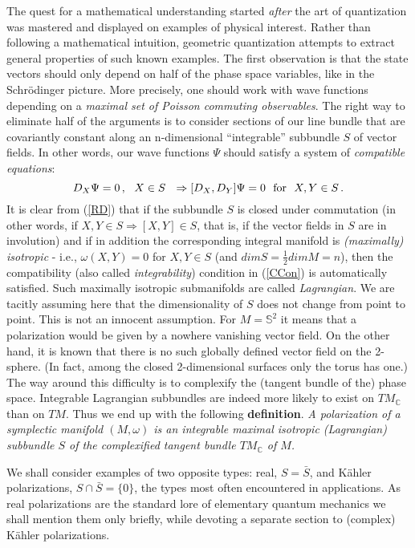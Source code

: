 \documentclass[12pt]{article}
\begin{document}
The quest for a mathematical understanding started {\it after} the art of quantization was mastered and
displayed on examples of physical interest. Rather than following a mathematical intuition, geometric quantization
attempts to extract general properties of such known examples. The first observation is that the state vectors
should only depend on half of the phase space variables, like in the Schr\"odinger picture. More precisely, one
should work with wave functions depending on a {\it maximal set of Poisson commuting observables}.  The right
way to eliminate half of the arguments is to consider sections of our line bundle that are covariantly constant
along an n-dimensional ``integrable'' subbundle $S$ of vector fields. In other words, our wave functions $\Psi$
should satisfy a system of {\it compatible equations}:
\begin{equation}
\label{CCon}
D_X\Psi = 0\,, \ \ X\in S \ \ \Rightarrow [D_X, D_Y]\Psi = 0 \ \ {\rm for} \ \ X, Y \in S\,.
\end{equation}
It is clear from (\ref{RD}) that if the subbundle $S$ is closed under commutation (in other words, if
$X, Y \in S \Rightarrow [X, Y] \in S$, that is, if the vector fields in $S$ are in involution) and if in
addition the corresponding integral manifold is {\it (maximally) isotropic} - i.e., $\omega(X, Y) = 0$ for $X, Y \in S$
(and $dim S = \frac{1}{2} dim M = n$), then the compatibility (also called {\it integrability}) condition in (\ref{CCon}) 
is automatically satisfied.  Such maximally isotropic submanifolds are called {\it Lagrangian}. We are tacitly
assuming here that the dimensionality of $S$ does not change from point to point. This is not an innocent assumption.
For $M = {\mathbb S}^2$ it means that a polarization would be given by a nowhere vanishing vector field. On the other
hand, it is known that there is no such globally defined vector field on the 2-sphere. (In fact, among the closed
2-dimensional surfaces only the torus has one.) The way around this difficulty is to complexify the (tangent bundle of
the) phase space. Integrable Lagrangian subbundles are indeed more likely to exist on $TM_{\mathbb{C}}$ than on $TM$.
Thus we end up with the following {\bf definition}. {\it A polarization of a symplectic manifold $(M, \omega)$ is an
integrable maximal isotropic (Lagrangian) subbundle $S$ of the complexified tangent bundle $TM_{\mathbb{C}}$ of $M$.}

We shall consider examples of two opposite types: real, $S=\bar{S}$, and 
K\"ahler polarizations, $S \cap \bar{S} = \{ 0 \}$, the types most often 
encountered in applications. As real polarizations are the standard lore of 
elementary quantum mechanics we shall mention them only briefly, while 
devoting a separate section to (complex) K\"ahler polarizations.
\end{document}
